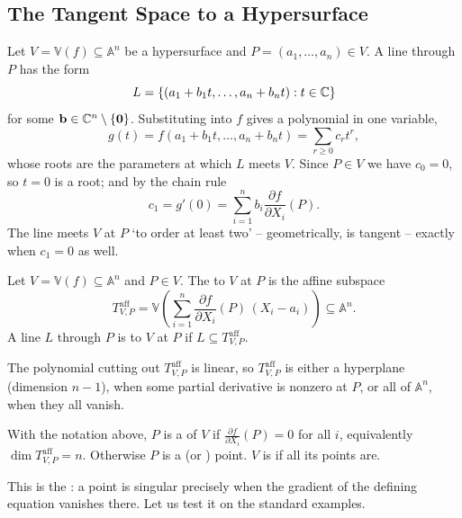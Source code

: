 \documentclass[a4paper]{scrartcl}
\newcommand{\A}{\mathbb{A}}
\newcommand{\V}{\mathbb{V}}
\begin{document}
\subsection{The Tangent Space to a Hypersurface}

Let $V = \V(f) \subseteq \A^n$ be a hypersurface and $P = (a_1,\dots,a_n) \in V$. A line through $P$ has the form
$$L = \{(a_1 + b_1t,\dots,a_n+b_nt) : t \in \mathbb{C}\}$$
for some $\mathbf b \in \mathbb{C}^n \setminus\{\mathbf 0\}$. Substituting into $f$ gives a polynomial in one variable,
$$g(t) = f(a_1+b_1t,\dots,a_n+b_nt) = \sum_{r \geq 0} c_r t^r,$$
whose roots are the parameters at which $L$ meets $V$. Since $P \in V$ we have $c_0 = 0$, so $t = 0$ is a root; and by the chain rule
$$c_1 = g'(0) = \sum_{i=1}^n b_i \frac{\partial f}{\partial X_i}(P).$$
The line meets $V$ at $P$ `to order at least two' -- geometrically, is tangent -- exactly when $c_1 = 0$ as well.

\begin{definition}
	Let $V = \V(f) \subseteq \A^n$ and $P \in V$. The  to $V$ at $P$ is the affine subspace
	$$T^{\mathrm{aff}}_{V,P} = \V\left(\sum_{i=1}^n \frac{\partial f}{\partial X_i}(P)\,(X_i - a_i)\right) \subseteq \A^n.$$
	A line $L$ through $P$ is  to $V$ at $P$ if $L \subseteq T^{\mathrm{aff}}_{V,P}$.
\end{definition}

The polynomial cutting out $T^{\mathrm{aff}}_{V,P}$ is linear, so $T^{\mathrm{aff}}_{V,P}$ is either a hyperplane (dimension $n-1$), when some partial derivative is nonzero at $P$, or all of $\A^n$, when they all vanish.

\begin{definition}
	With the notation above, $P$ is a  of $V$ if $\frac{\partial f}{\partial X_i}(P) = 0$ for all $i$, equivalently $\dim T^{\mathrm{aff}}_{V,P} = n$. Otherwise $P$ is a  (or ) point. $V$ is  if all its points are.
\end{definition}

This is the : a point is singular precisely when the gradient of the defining equation vanishes there. Let us test it on the standard examples.
\end{document}
